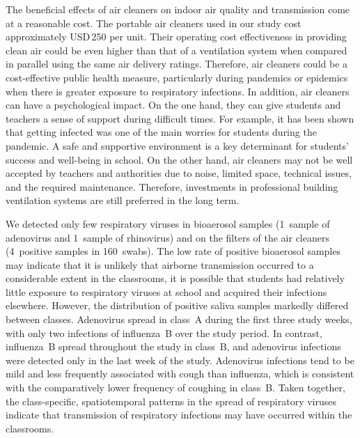 \documentclass[fleqn,11pt]{wlscirep}
\begin{document}
The beneficial effects of air cleaners on indoor air quality and transmission come at a reasonable cost. The portable air cleaners used in our study cost approximately USD\,250 per unit. Their operating cost effectiveness in providing clean air could be even higher than that of a ventilation system when compared in parallel using the same air delivery ratings\cite{Noh2016EnBuild}. Therefore, air cleaners could be a cost-effective public health measure, particularly during pandemics or epidemics when there is greater exposure to respiratory infections. In addition, air cleaners can have a psychological impact. On the one hand, they can give students and teachers a sense of support during difficult times. For example, it has been shown that getting infected was one of the main worries for students during the pandemic\cite{Yuerekli2022IJERPH}. A safe and supportive environment is a key determinant for students' success and well-being in school\cite{Kutsyuruba2015RevEduc}. On the other hand, air cleaners may not be well accepted by teachers and authorities due to noise, limited space, technical issues, and the required maintenance\cite{Sanguinetti2022IndoorAir}. Therefore, investments in professional building ventilation systems are still preferred in the long term\cite{Nardell2016}.


We detected only few respiratory viruses in bioaerosol samples (1~sample of adenovirus and 1~sample of rhinovirus) and on the filters of the air cleaners (4~positive samples in 160~swabs). The low rate of positive bioaerosol samples may indicate that it is unlikely that airborne transmission occurred to a considerable extent in the classrooms, \ie it is possible that students had relatively little exposure to respiratory viruses at school and acquired their infections elsewhere. However, the distribution of positive saliva samples markedly differed between classes. Adenovirus spread in class~A during the first three study weeks, with only two infections of influenza~B over the study period. In contrast, influenza~B spread throughout the study in class~B, and adenovirus infections were detected only in the last week of the study. Adenovirus infections tend to be mild\cite{Kunz2010CIDR} and less frequently associated with cough than influenza\cite{Ma2018RMV}, which is consistent with the comparatively lower frequency of coughing in class~B. Taken together, the class-specific, spatiotemporal patterns in the spread of respiratory viruses indicate that transmission of respiratory infections may have occurred within the classrooms. 
\end{document}
